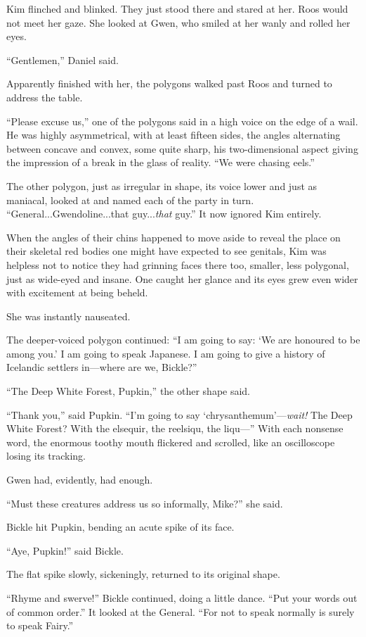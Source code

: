 \documentclass[11pt,a5paper]{article}
\begin{document}
Kim flinched and blinked. They just stood there and stared at her. Roos would not meet her gaze. She looked at Gwen, who smiled at her wanly and rolled her eyes.

``Gentlemen,'' Daniel said.

Apparently finished with her, the polygons walked past Roos and turned to address the table.

``Please excuse us,'' one of the polygons said in a high voice on the edge of a wail. He was highly asymmetrical, with at least fifteen sides, the angles alternating between concave and convex, some quite sharp, his two-dimensional aspect giving the impression of a break in the glass of reality. ``We were chasing eels.''

The other polygon, just as irregular in shape, its voice lower and just as maniacal, looked at and named each of the party in turn. ``General...Gwendoline...that guy...\emph{that} guy.'' It now ignored Kim entirely.

When the angles of their chins happened to move aside to reveal the place on their skeletal red bodies one might have expected to see genitals, Kim was helpless not to notice they had grinning faces there too, smaller, less polygonal, just as wide-eyed and insane. One caught her glance and its eyes grew even wider with excitement at being beheld.

She was instantly nauseated.

The deeper-voiced polygon continued: ``I am going to say: `We are honoured to be among you.' I am going to speak Japanese. I am going to give a history of Icelandic settlers in---where are we, Bickle?''

``The Deep White Forest, Pupkin,'' the other shape said.

``Thank you,'' said Pupkin. ``I'm going to say `chrysanthemum'---\emph{wait!} The Deep White Forest? With the elsequir, the reelsiqu, the liqu---'' With each nonsense word, the enormous toothy mouth flickered and scrolled, like an oscilloscope losing its tracking.

Gwen had, evidently, had enough.

``Must these creatures address us so informally, Mike?'' she said.

Bickle hit Pupkin, bending an acute spike of its face.

``Aye, Pupkin!'' said Bickle.

The flat spike slowly, sickeningly, returned to its original shape.

``Rhyme and swerve!'' Bickle continued, doing a little dance. ``Put your words out of common order.'' It looked at the General. ``For not to speak normally is surely to speak Fairy.''
\end{document}
